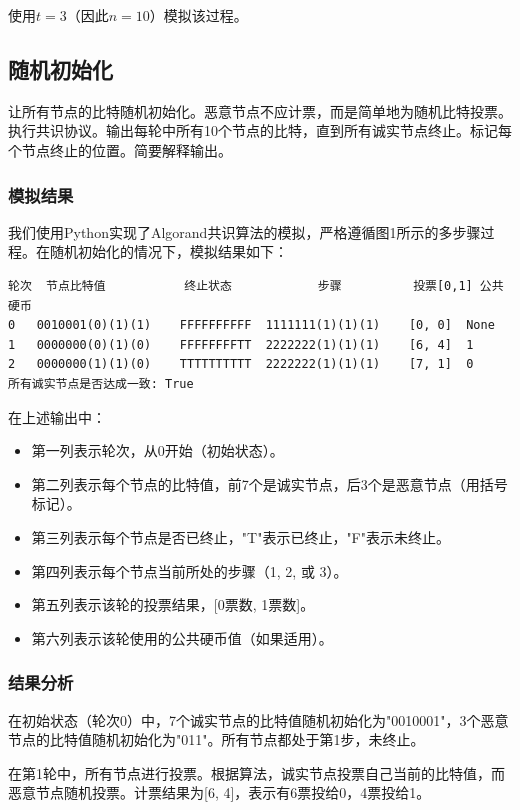 \documentclass[12pt,a4paper]{article}
\begin{document}
\begin{CJK}{UTF8}{gbsn}
使用$t = 3$（因此$n = 10$）模拟该过程。

\subsection{随机初始化}

让所有节点的比特随机初始化。恶意节点不应计票，而是简单地为随机比特投票。执行共识协议。输出每轮中所有10个节点的比特，直到所有诚实节点终止。标记每个节点终止的位置。简要解释输出。

\subsubsection{模拟结果}

我们使用Python实现了Algorand共识算法的模拟，严格遵循图1所示的多步骤过程。在随机初始化的情况下，模拟结果如下：

\begin{verbatim}
轮次	节点比特值			终止状态			步骤			投票[0,1]	公共硬币
0	0010001(0)(1)(1)	FFFFFFFFFF	1111111(1)(1)(1)	[0, 0]	None
1	0000000(0)(1)(0)	FFFFFFFFTT	2222222(1)(1)(1)	[6, 4]	1
2	0000000(1)(1)(0)	TTTTTTTTTT	2222222(1)(1)(1)	[7, 1]	0
所有诚实节点是否达成一致: True
\end{verbatim}

在上述输出中：
\begin{itemize}
    \item 第一列表示轮次，从0开始（初始状态）。
    \item 第二列表示每个节点的比特值，前7个是诚实节点，后3个是恶意节点（用括号标记）。
    \item 第三列表示每个节点是否已终止，"T"表示已终止，"F"表示未终止。
    \item 第四列表示每个节点当前所处的步骤（1, 2, 或 3）。
    \item 第五列表示该轮的投票结果，[0票数, 1票数]。
    \item 第六列表示该轮使用的公共硬币值（如果适用）。
\end{itemize}

\subsubsection{结果分析}

在初始状态（轮次0）中，7个诚实节点的比特值随机初始化为"0010001"，3个恶意节点的比特值随机初始化为"011"。所有节点都处于第1步，未终止。

在第1轮中，所有节点进行投票。根据算法，诚实节点投票自己当前的比特值，而恶意节点随机投票。计票结果为[6, 4]，表示有6票投给0，4票投给1。


\end{CJK}
\end{document}
